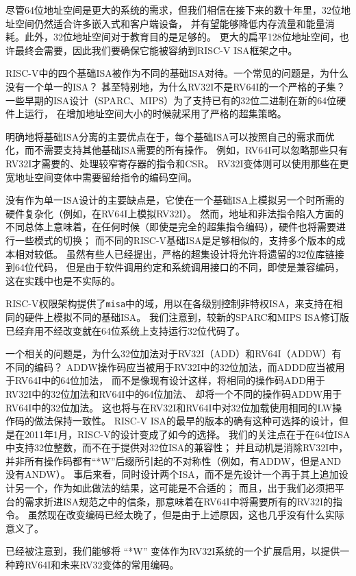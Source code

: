\begin{commentary}
尽管64位地址空间是更大的系统的需求，但我们相信在接下来的数十年里，32位地址空间仍然适合许多嵌入式和客户端设备，
并有望能够降低内存流量和能量消耗。此外，32位地址空间对于教育目的是足够的。
更大的扁平128位地址空间，也许最终会需要，因此我们要确保它能被容纳到RISC-V ISA框架之中。
\end{commentary}

\begin{commentary}
RISC-V中的四个基础ISA被作为不同的基础ISA对待。一个常见的问题是，为什么没有一个单一的ISA？
甚至特别地，为什么RV32I不是RV64I的一个严格的子集？
一些早期的ISA设计（SPARC、MIPS）为了支持已有的32位二进制在新的64位硬件上运行，
在增加地址空间大小的时候就采用了严格的超集策略。

明确地将基础ISA分离的主要优点在于，每个基础ISA可以按照自己的需求而优化，而不需要支持其他基础ISA需要的所有操作。
例如，RV64I可以忽略那些只有RV32I才需要的、处理较窄寄存器的指令和CSR。
RV32I变体则可以使用那些在更宽地址空间变体中需要留给指令的编码空间。

没有作为单一ISA设计的主要缺点是，它使在一个基础ISA上模拟另一个时所需的硬件复杂化（例如，在RV64I上模拟RV32I）。
然而，地址和非法指令陷入方面的不同总体上意味着，在任何时候（即使是完全的超集指令编码），硬件也将需要进行一些模式的切换；
而不同的RISC-V基础ISA是足够相似的，支持多个版本的成本相对较低。
虽然有些人已经提出，严格的超集设计将允许将遗留的32位库链接到64位代码，
但是由于软件调用约定和系统调用接口的不同，即使是兼容编码，这在实践中也是不实际的。

RISC-V权限架构提供了{\tt misa}中的域，用以在各级别控制非特权ISA，来支持在相同的硬件上模拟不同的基础ISA。
我们注意到，较新的SPARC和MIPS ISA修订版已经弃用不经改变就在64位系统上支持运行32位代码了。

一个相关的问题是，为什么32位加法对于RV32I（ADD）和RV64I（ADDW）有不同的编码？
ADDW操作码应当被用于RV32I中的32位加法，而ADDD应当被用于RV64I中的64位加法，
而不是像现有设计这样，将相同的操作码ADD用于RV32I中的32位加法和RV64I中的64位加法、
却将一个不同的操作码ADDW用于RV64I中的32位加法。
这也将与在RV32I和RV64I中对32位加载使用相同的LW操作码的做法保持一致性。
RISC-V ISA的最早的版本的确有这种可选择的设计，但是在2011年1月，RISC-V的设计变成了如今的选择。
我们的关注点在于在64位ISA中支持32位整数，而不在于提供对32位ISA的兼容性；
并且动机是消除RV32I中，并非所有操作码都有“*W”后缀所引起的不对称性（例如，有ADDW，但是AND没有ANDW）。
事后来看，同时设计两个ISA，而不是先设计一个再于其上追加设计另一个，作为如此做法的结果，这可能是不合适的；
而且，出于我们必须把平台的需求折进ISA规范之中的信条，那意味着在RV64I中将需要所有的RV32I的指令。
虽然现在改变编码已经太晚了，但是由于上述原因，这也几乎没有什么实际意义了。

已经被注意到，我们能够将 “*W” 变体作为RV32I系统的一个扩展启用，以提供一种跨RV64I和未来RV32变体的常用编码。
\end{commentary}

